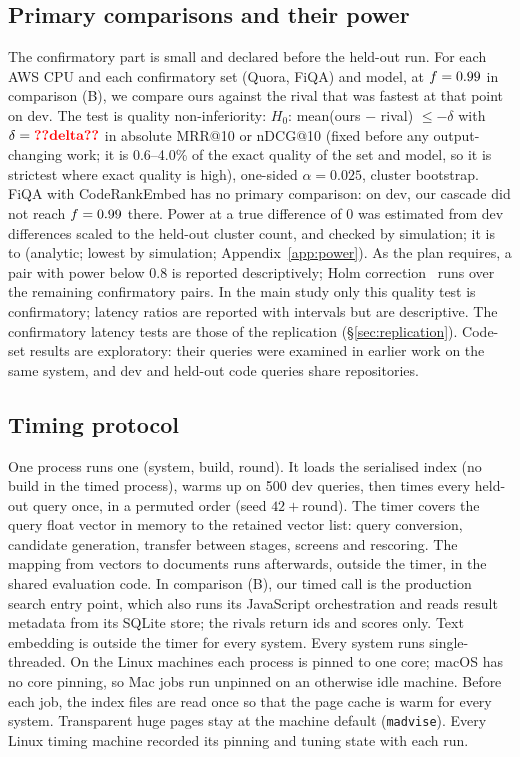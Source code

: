 \subsection{Primary comparisons and their power}

The confirmatory part is small and declared before the held-out run. For each AWS CPU and each
confirmatory set (Quora, FiQA) and model, at $f = 0.99$ in comparison (B), we compare ours against the
rival that was fastest at that point on dev. The test is quality non-inferiority: $H_0$: mean(ours $-$
rival) $\le -\delta$ with $\delta = \nm{delta}$ in absolute MRR@10 or nDCG@10 (fixed before any output-changing work;
it is 0.6--4.0\% of the exact quality of the set and model, so it is strictest where exact quality is high), one-sided
$\alpha = 0.025$, cluster bootstrap. FiQA with CodeRankEmbed has no primary comparison: on dev, our
cascade did not reach $f = 0.99$ there. Power at a true difference of 0 was estimated from dev
differences scaled to the held-out cluster count, and checked by simulation; it is
 to  (analytic;  lowest by simulation;
Appendix~\ref{app:power}). As the plan requires, a pair with power below 0.8 is reported descriptively;
Holm correction~\cite{holm1979simple} runs over the remaining  confirmatory pairs. In the main study
only this quality test is confirmatory; latency ratios are reported with intervals but are descriptive. The confirmatory
latency tests are those of the replication (\S\ref{sec:replication}).
Code-set results are exploratory: their queries were examined in earlier work on the same system,
and dev and held-out code queries share repositories.

\subsection{Timing protocol}\label{sec:timing}

One process runs one (system, build, round). It loads the serialised index (no build in the timed
process), warms up on 500 dev queries, then times every held-out query once, in a permuted order
(seed $42 + \text{round}$). The timer covers the query float vector in memory to the retained vector
list: query conversion, candidate generation, transfer between stages, screens and rescoring. The
mapping from vectors to documents runs afterwards, outside the timer, in the shared evaluation code.
In comparison (B), our timed call is the production search entry point, which also runs its JavaScript
orchestration and reads result metadata from its SQLite store; the rivals return ids and scores only. Text embedding is outside the timer for every system. Every system runs single-threaded.
On the Linux machines each process is pinned to one core; macOS has no core pinning, so Mac jobs run
unpinned on an otherwise idle machine. Before each job, the index files are read once so that the
page cache is warm for every system. Transparent huge pages stay at the machine default
(\texttt{madvise}). Every Linux timing machine recorded its pinning and tuning state with each run.

